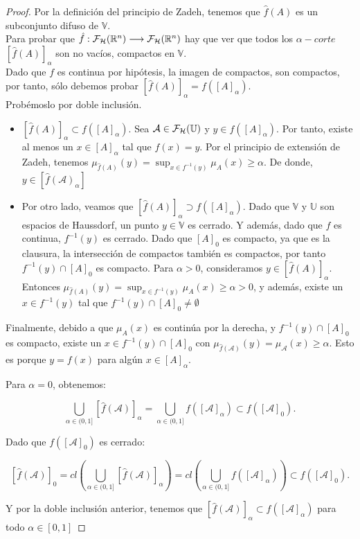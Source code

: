 \begin{proof}
	Por la definición del principio de Zadeh, tenemos que $\hat{f}(A)$ es un subconjunto difuso de $\mathbb{V}$. \\
	Para probar que $\hat{f} : \mathcal{F}_\mathcal{H}(\mathbb R^n) \longrightarrow \mathcal{F}_\mathcal{H}(\mathbb R^n)$ hay que ver que todos los $\alpha-corte$ $[\hat{f}(A)]_\alpha$ son no vacíos, compactos en $\mathbb{V}$. \\
	Dado que $f$ es continua por hipótesis, la imagen de compactos, son compactos, por tanto, sólo debemos probar $[\hat{f}(A)]_\alpha = f([A]_\alpha)$. \\
	Probémoslo por doble inclusión.
	
	\begin{itemize}
		\item $[\hat{f}(A)]_\alpha \subset f([A]_\alpha)$. Sea $\mathcal{A} \in \mathcal{F}_\mathcal{H}(\mathbb U)$ y $y \in f([A]_\alpha)$. Por tanto, existe al menos un $x \in [A]_\alpha$ tal que $f(x)=y$. Por el principio de extensión de Zadeh, tenemos $\mu_{\hat{f}(A)}(y)=\sup_{x\in f^{-1}(y)} \mu_A(x) \geq \alpha$. De donde, $y \in [\hat{f}(\mathcal{A})_\alpha]$
		\item Por otro lado, veamos que $[\hat{f}(A)]_\alpha \supset f([A]_\alpha)$. Dado que $\mathbb{V}$ y $\mathbb{U}$ son espacios de Haussdorf, un punto $y \in \mathbb{V}$ es cerrado. Y además, dado que $f$ es continua, $f^{-1}(y)$ es cerrado. Dado que $[A]_0$ es compacto, ya que es la clausura, la intersección de compactos también es compactos, por tanto $f^{-1}(y) \cap [A]_0$ es compacto. Para $\alpha>0$, consideramos $y \in [\hat{f}(A)]_\alpha$. Entonces $\mu_{\hat{f}(A)}(y)=\sup_{x\in f^{-1}(y)} \mu_A(x) \geq \alpha>0$, y además, existe un $x\in f^{-1}(y)$ tal que $f^{-1}(y) \cap [A]_0 \neq \emptyset$
	\end{itemize}
	Finalmente, debido a que $\mu_A(x)$ es continúa por la derecha, y $f^{-1}(y) \cap [A]_0$ es compacto, existe un $x \in f^{-1}(y) \cap [A]_0$ con $\mu_{\hat{f}(\mathcal{A})}(y)=\mu_{\mathcal{A}}(x) \geq \alpha$. Esto es porque $y=f(x)$ para algún $x \in [A]_\alpha$.
	
	Para $\alpha=0$, obtenemos:
	
	$$
	\bigcup_{\alpha \in (0, 1]} [\hat{f}(\mathcal{A})]_\alpha = \bigcup_{\alpha \in (0, 1]} f([\mathcal{A}]_\alpha) \subset f([\mathcal{A}]_0).
	$$
	
	Dado que $f([\mathcal{A}]_0)$ es cerrado:
	
	$$
	[\hat{f}(\mathcal{A})]_0 = cl\left( \bigcup_{\alpha \in (0, 1]} [\hat{f}(\mathcal{A})]_\alpha  \right) = cl\left(\bigcup_{\alpha \in (0, 1]} f([\mathcal{A}]_\alpha) \right)	\subset f([\mathcal{A}]_0).
	$$
	
	Y por la doble inclusión anterior, tenemos que $[\hat{f}(\mathcal{A})]_\alpha \subset f([\mathcal{A}]_\alpha)$ para todo $\alpha \in [0, 1]$
\end{proof}

